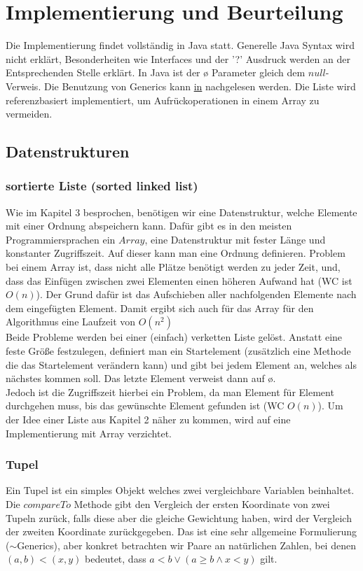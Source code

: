 \section{Implementierung und Beurteilung}
Die Implementierung findet vollständig in Java statt. Generelle Java Syntax wird nicht erklärt, Besonderheiten wie Interfaces und der '?' Ausdruck werden an der Entsprechenden Stelle erklärt. In Java ist der ø Parameter gleich dem $null$-Verweis. Die Benutzung von Generics kann  \href{https://docs.oracle.com/javase/tutorial/java/generics/index.html}{in\cite{oracle}} nachgelesen werden. Die Liste wird referenzbasiert implementiert, um Aufrückoperationen in einem Array zu vermeiden. 
\subsection{Datenstrukturen}
\subsubsection{sortierte Liste (sorted linked list)}
\normalsize
Wie im Kapitel 3 besprochen, benötigen wir eine Datenstruktur, welche Elemente mit einer Ordnung abspeichern kann. Dafür gibt es in den meisten Programmiersprachen ein $Array$, eine Datenstruktur mit fester Länge und konstanter Zugriffszeit. Auf dieser kann man eine Ordnung definieren. Problem bei  einem Array ist, dass nicht alle Plätze benötigt werden zu jeder Zeit, und, dass das Einfügen zwischen zwei Elementen einen höheren Aufwand hat (WC ist $O(n)$). Der Grund dafür ist das Aufschieben aller nachfolgenden Elemente nach dem eingefügten Element. Damit ergibt sich auch für das Array für den Algorithmus eine Laufzeit von $O(n^2)$\\
Beide Probleme werden bei einer (einfach) verketten Liste gelöst. Anstatt eine feste Größe festzulegen, definiert man ein Startelement (zusätzlich eine Methode die das Startelement verändern kann) und gibt bei jedem Element an, welches als nächstes kommen soll. Das letzte Element verweist dann auf ø.\\


Jedoch ist die Zugriffszeit hierbei ein Problem, da man Element für Element durchgehen muss, bis das gewünschte Element gefunden ist (WC $O(n)$). Um der Idee einer Liste aus Kapitel 2 näher zu kommen, wird auf eine Implementierung mit Array verzichtet.

\subsubsection*{Tupel}
Ein Tupel ist ein simples Objekt welches zwei vergleichbare Variablen beinhaltet. Die $compareTo$ Methode gibt den Vergleich der ersten Koordinate von zwei Tupeln zurück, falls diese aber die gleiche Gewichtung haben, wird der Vergleich der zweiten Koordinate zurückgegeben. Das ist eine sehr allgemeine Formulierung ($\sim$Generics), aber konkret betrachten wir Paare an natürlichen Zahlen, bei denen $(a,b)<(x,y)$ bedeutet, dass $a<b \vee (a\geq b \wedge x<y)$ gilt. \newpage

